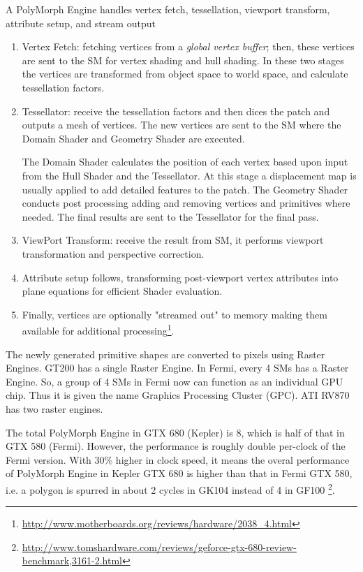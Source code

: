 A PolyMorph Engine handles vertex fetch, tessellation, viewport transform, 
attribute setup, and stream output
\begin{enumerate}
\item Vertex Fetch: fetching vertices from a
  {\it global vertex buffer}; then, these vertices are sent to the SM
  for vertex shading and hull shading. In these two stages the
  vertices are transformed from object space to world space, and
  calculate tessellation factors.

\item Tessellator: receive the tessellation factors and then dices the
  patch and outputs a mesh of vertices. The new vertices are sent to
  the SM where the Domain Shader and Geometry Shader are executed.

  The Domain Shader calculates the position of each vertex based upon
  input from the Hull Shader and the Tessellator. At this stage a
  displacement map is usually applied to add detailed features to the
  patch. The Geometry Shader conducts post processing adding and
  removing vertices and primitives where needed. The final results are
  sent to the Tessellator for the final pass.

\item ViewPort Transform: receive the result from SM, it performs viewport
  transformation and perspective correction. 

\item Attribute setup follows, transforming post-viewport vertex
  attributes into plane equations for efficient Shader evaluation.

\item Finally, vertices are optionally
  "streamed out" to memory making them available for additional
  processing\footnote{\url{http://www.motherboards.org/reviews/hardware/2038_4.html}}. 
\end{enumerate}

\begin{framed}
  
  The newly generated primitive shapes are converted to pixels using
  Raster Engines. GT200 has a single Raster Engine. In Fermi, every 4
  SMs has a Raster Engine. So, a group of 4 SMs in Fermi now can
  function as an individual GPU chip. Thus it is given the name
  Graphics Processing Cluster (GPC).  ATI RV870 has two raster
  engines.
\end{framed}


The total PolyMorph Engine in GTX 680 (Kepler) is 8, which is half of that in
GTX 580 (Fermi). However, the performance is roughly double per-clock of the
Fermi version. With 30\% higher in clock speed, it means the overal performance
of PolyMorph Engine in Kepler GTX 680 is higher than that in Fermi GTX 580, i.e.
a polygon is spurred in about 2 cycles in GK104 instead of 4 in GF100
\footnote{\url{http://www.tomshardware.com/reviews/geforce-gtx-680-review-benchmark,3161-2.html}}.

